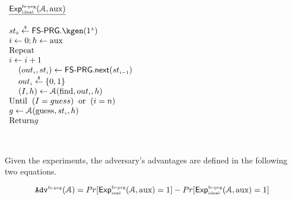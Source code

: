    
   
   \begin{center}
   \begin{minipage}{57mm}
   
\begin{tcolorbox}[left=0mm]
$
  \begin{array}{l}
 \underline{\mathsf{Exp}_{\sss \text{ideal}}^{\sss \text{fs-prg}}(\mathcal{A}, \text{aux})}\\
  \\
   {st}_{\sss 0}\stackrel{\sss \$}\leftarrow \mathsf{FS\text{-}PRG}.\kgen (1^{\sss \lambda}) \\
%
i\gets 0; h\gets \text{aux} \\
\text {Repeat}\\
i\gets i+1\\
\hspace{4mm} ({out}_{\sss i}, st_{\sss i})\leftarrow  \mathsf{FS\text{-}PRG.next}   (st_{\sss i-1})\\
\hspace{4mm}{out}_{\sss i}\stackrel{\sss \$}\leftarrow\{0, 1\}\\
\hspace{4mm}  (I,h)\gets\mathcal{A}(\text{find}, out_{\sss i}, h)\\
\text{Until}\hspace{2mm}  (I=guess)\hspace{2mm}  \text{or}\hspace{2mm}  (i=n)\\
g\gets\mathcal{A}(\text{guess}, st_{\sss i}, h)\\
\text{Return} g\\
  \end{array}%
$
\end{tcolorbox}
   \end{minipage}
        \end{center}
\



Given the experiments, the adversary's advantages are defined in the following two equations. 


\begin{equation}\label{equ::adv-1st-term}
\mathtt{Adv}^{\scriptscriptstyle \text{fs-prg}}(\mathcal{A})=Pr[\mathsf{Exp}_{\scriptscriptstyle \text{real}}^{\scriptscriptstyle \text{fs-prg}}(\mathcal{A},\text{aux})=1]-Pr[\mathsf{Exp}_{\scriptscriptstyle \text{ideal}}^{\scriptscriptstyle \text{fs-prg}}(\mathcal{A},\text{aux})=1]
\end{equation}


